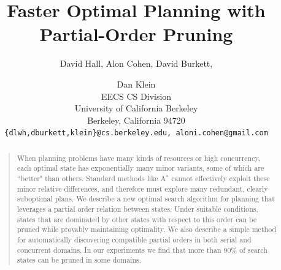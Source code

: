 \documentclass[letterpaper]{article}
\theoremstyle{plain} \newtheorem{theorem}{Theorem} \newtheorem{proposition}{Proposition} \newtheorem{lemma}{Lemma}
\theoremstyle{definition} \newtheorem{definition}{Definition} \newtheorem{conjecture}{Conjecture} \newtheorem*{example}{Example}
\theoremstyle{remark} \newtheorem*{remark}{Remark} \newtheorem*{note}{Note} \newtheorem{case}{Case}
\newcommand{\Astar}{A$^*$ }
\begin{document}
%
\title{Faster Optimal Planning with Partial-Order Pruning}
\author{David Hall, Alon Cohen, David Burkett, \and Dan Klein \\
EECS CS Division\\
University of California Berkeley\\
Berkeley, California 94720\\
{\tt\{dlwh,dburkett,klein\}@cs.berkeley.edu, aloni.cohen@gmail.com}
}

\maketitle
\begin{abstract}
\begin{quote}
  When planning problems have many kinds of resources or high
  concurrency, each optimal state has exponentially many minor
  variants, some of which are ``better" than others. Standard methods
  like \Astar cannot effectively exploit these minor relative differences,
  and therefore must explore many redundant, clearly suboptimal
  plans. We describe a new optimal search algorithm for planning
  that leverages a partial order relation between states. Under
  suitable conditions, states that are dominated by other states with
  respect to this order can be pruned while provably maintaining
  optimality. We also describe a simple method for automatically
  discovering compatible partial orders in both serial and concurrent
  domains. In our experiments we find that more than 90\% of search
  states can be pruned in some domains.
\end{quote}
\end{abstract}
\end{document}
